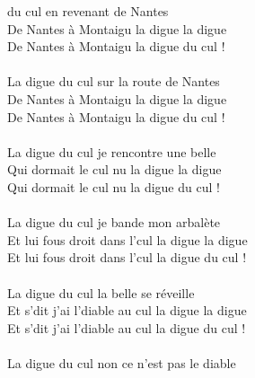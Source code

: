 %
 du cul en revenant de Nantes ~~~~\bissimple
\\De Nantes à Montaigu la digue la digue
\\De Nantes à Montaigu la digue du cul !
\\\\La digue du cul sur la route de Nantes  ~\bissimple
\\De Nantes à Montaigu la digue la digue
\\De Nantes à Montaigu la digue du cul !
\\\\La digue du cul je rencontre une belle ~\bissimple
\\Qui dormait le cul nu la digue la digue
\\Qui dormait le cul nu la digue du cul !
\\\\La digue du cul je bande mon arbalète  ~~~~~~\bissimple
\\Et lui fous droit dans l'cul la digue la digue
\\Et lui fous droit dans l'cul la digue du cul !
\\\\La digue du cul la belle se réveille  ~~~~~~~~~~~~\bissimple
\\Et s'dit j'ai l'diable au cul la digue la digue
\\Et s'dit j'ai l'diable au cul la digue du cul !
\\\\La digue du cul non ce n'est pas le diable  ~\bissimple
